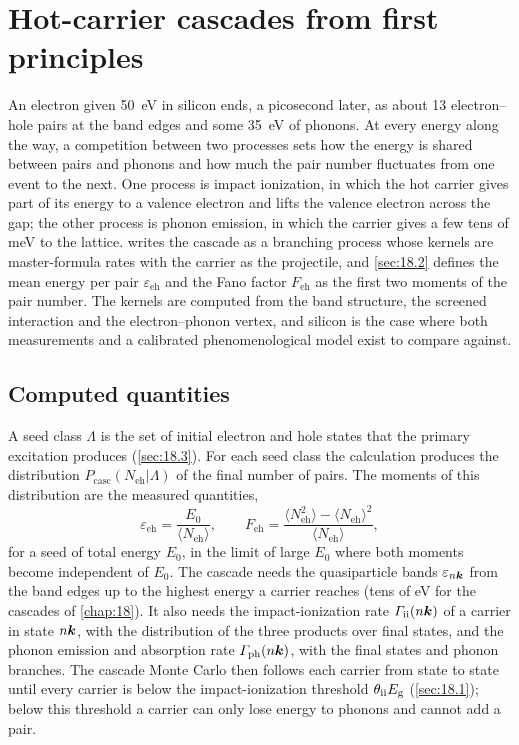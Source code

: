 \section{Hot-carrier cascades from first principles}\label{app:E.13}

An electron given \SI{50}{eV} in silicon ends, a picosecond later, as about 13 electron--hole pairs at the band edges and some \SI{35}{eV} of phonons. At every energy along the way, a competition between two processes sets how the energy is shared between pairs and phonons and how much the pair number fluctuates from one event to the next. One process is impact ionization, in which the hot carrier gives part of its energy to a valence electron and lifts the valence electron across the gap; the other process is phonon emission, in which the carrier gives a few tens of meV to the lattice.  writes the cascade as a branching process whose kernels are master-formula rates with the carrier as the projectile, and \cref{sec:18.2} defines the mean energy per pair $\varepsilon_{\mathrm{eh}}$ and the Fano factor $F_{\mathrm{eh}}$ as the first two moments of the pair number. The kernels are computed from the band structure, the screened interaction and the electron--phonon vertex, and silicon is the case where both measurements and a calibrated phenomenological model exist to compare against.

\subsection{Computed quantities}

A seed class $\Lambda$ is the set of initial electron and hole states that the primary excitation produces (\cref{sec:18.3}). For each seed class the calculation produces the distribution $P_{\mathrm{casc}}(N_{\mathrm{eh}}|\Lambda)$ of the final number of pairs. The moments of this distribution are the measured quantities,
\begin{equation}
  \varepsilon_{\mathrm{eh}} = \frac{E_0}{\langle N_{\mathrm{eh}}\rangle}, \qquad
  F_{\mathrm{eh}} = \frac{\langle N_{\mathrm{eh}}^2\rangle - \langle N_{\mathrm{eh}}\rangle^2}{\langle N_{\mathrm{eh}}\rangle},
  \label{eq:E.13-moments}
\end{equation}
for a seed of total energy $E_0$, in the limit of large $E_0$ where both moments become independent of $E_0$. The cascade needs the quasiparticle bands $\varepsilon_{n\bm{k}}$ from the band edges up to the highest energy a carrier reaches (tens of eV for the cascades of \cref{chap:18}). It also needs the impact-ionization rate $\varGamma_{\mathrm{ii}}(n\bm{k})$ of a carrier in state $n\bm{k}$, with the distribution of the three products over final states, and the phonon emission and absorption rate $\varGamma_{\mathrm{ph}}(n\bm{k})$, with the final states and phonon branches. The cascade Monte Carlo then follows each carrier from state to state until every carrier is below the impact-ionization threshold $\theta_{\mathrm{ii}}E_{\mathrm{g}}$ (\cref{sec:18.1}); below this threshold a carrier can only lose energy to phonons and cannot add a pair.

